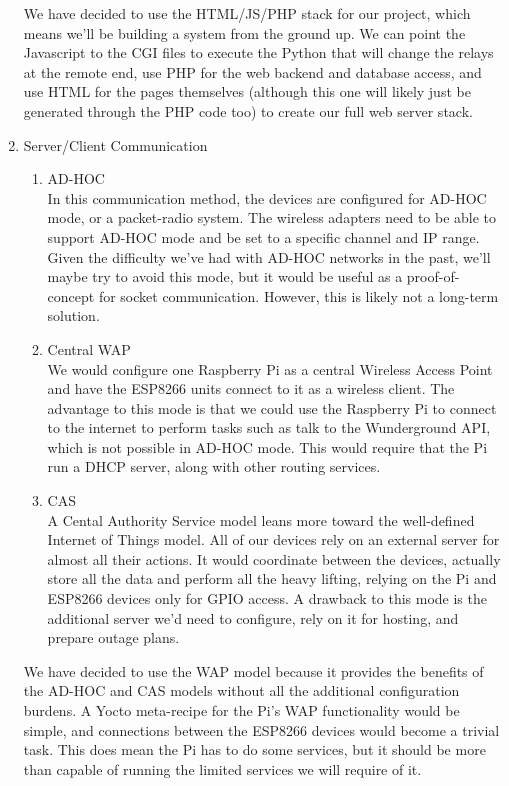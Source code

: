 \documentclass[12pt]{article}
\begin{document}
\begin{enumerate}
\begin{enumerate}
        \end{enumerate}
        We have decided to use the HTML/JS/PHP stack for our project, which means we'll be building a system from the ground up. We can point the Javascript to the CGI files to execute the Python that will change the relays at the remote end, use PHP for the web backend and database access, and use HTML for the pages themselves (although this one will likely just be generated through the PHP code too) to create our full web server stack.
    \item Server/Client Communication
        \begin{enumerate}
            \item AD-HOC \\
            In this communication method, the devices are configured for AD-HOC mode, or a packet-radio system. The wireless adapters need to be able to support AD-HOC mode and be set to a specific channel and IP range. Given the difficulty we've had with AD-HOC networks in the past, we'll maybe try to avoid this mode, but it would be useful as a proof-of-concept for socket communication. However, this is likely not a long-term solution.
            \item Central WAP \\
            We would configure one Raspberry Pi as a central Wireless Access Point and have the ESP8266 units connect to it as a wireless client. The advantage to this mode is that we could use the Raspberry Pi to connect to the internet to perform tasks such as talk to the Wunderground API, which is not possible in AD-HOC mode. This would require that the Pi run a DHCP server, along with other routing services.
            \item CAS \\
            A Cental Authority Service model leans more toward the well-defined Internet of Things model. All of our devices rely on an external server for almost all their actions. It would coordinate between the devices, actually store all the data and perform all the heavy lifting, relying on the Pi and ESP8266 devices only for GPIO access. A drawback to this mode is the additional server we'd need to configure, rely on it for hosting, and prepare outage plans.
        \end{enumerate}
        We have decided to use the WAP model because it provides the benefits of the AD-HOC and CAS models without all the additional configuration burdens. A Yocto meta-recipe for the Pi's WAP functionality would be simple, and connections between the ESP8266 devices would become a trivial task. This does mean the Pi has to do some services, but it should be more than capable of running the limited services we will require of it.
\end{enumerate}
    
\end{document}
